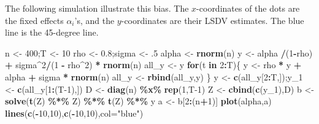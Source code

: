\documentclass[
  12pt,
]{book}
\newenvironment{Shaded}{\begin{snugshade}}{\end{snugshade}}
\newcommand{\AttributeTok}[1]{\textcolor[rgb]{0.13,0.29,0.53}{#1}}
\newcommand{\ControlFlowTok}[1]{\textcolor[rgb]{0.13,0.29,0.53}{\textbf{#1}}}
\newcommand{\DecValTok}[1]{\textcolor[rgb]{0.00,0.00,0.81}{#1}}
\newcommand{\FloatTok}[1]{\textcolor[rgb]{0.00,0.00,0.81}{#1}}
\newcommand{\FunctionTok}[1]{\textcolor[rgb]{0.13,0.29,0.53}{\textbf{#1}}}
\newcommand{\NormalTok}[1]{#1}
\newcommand{\OtherTok}[1]{\textcolor[rgb]{0.56,0.35,0.01}{#1}}
\newcommand{\SpecialCharTok}[1]{\textcolor[rgb]{0.81,0.36,0.00}{\textbf{#1}}}
\newcommand{\StringTok}[1]{\textcolor[rgb]{0.31,0.60,0.02}{#1}}
\theoremstyle{definition}
\theoremstyle{definition}
\theoremstyle{definition}
\theoremstyle{definition}
\theoremstyle{remark}
\begin{document}
The following simulation illustrate this bias. The \(x\)-coordinates of the dots are the fixed effects \(\alpha_i\)'s, and the \(y\)-coordinates are their LSDV estimates. The blue line is the 45-degree line.

\begin{Shaded}
\begin{Highlighting}[]
\NormalTok{n }\OtherTok{\textless{}{-}} \DecValTok{400}\NormalTok{;T }\OtherTok{\textless{}{-}} \DecValTok{10}
\NormalTok{rho }\OtherTok{\textless{}{-}} \FloatTok{0.8}\NormalTok{;sigma }\OtherTok{\textless{}{-}}\NormalTok{ .}\DecValTok{5}
\NormalTok{alpha }\OtherTok{\textless{}{-}} \FunctionTok{rnorm}\NormalTok{(n)}
\NormalTok{y }\OtherTok{\textless{}{-}}\NormalTok{ alpha }\SpecialCharTok{/}\NormalTok{(}\DecValTok{1}\SpecialCharTok{{-}}\NormalTok{rho) }\SpecialCharTok{+}\NormalTok{ sigma}\SpecialCharTok{\^{}}\DecValTok{2}\SpecialCharTok{/}\NormalTok{(}\DecValTok{1} \SpecialCharTok{{-}}\NormalTok{ rho}\SpecialCharTok{\^{}}\DecValTok{2}\NormalTok{) }\SpecialCharTok{*} \FunctionTok{rnorm}\NormalTok{(n)}
\NormalTok{all\_y }\OtherTok{\textless{}{-}}\NormalTok{ y}
\ControlFlowTok{for}\NormalTok{(t }\ControlFlowTok{in} \DecValTok{2}\SpecialCharTok{:}\NormalTok{T)\{}
\NormalTok{  y }\OtherTok{\textless{}{-}}\NormalTok{ rho }\SpecialCharTok{*}\NormalTok{ y }\SpecialCharTok{+}\NormalTok{ alpha }\SpecialCharTok{+}\NormalTok{ sigma }\SpecialCharTok{*} \FunctionTok{rnorm}\NormalTok{(n)}
\NormalTok{  all\_y }\OtherTok{\textless{}{-}} \FunctionTok{rbind}\NormalTok{(all\_y,y)}
\NormalTok{\}}
\NormalTok{y   }\OtherTok{\textless{}{-}} \FunctionTok{c}\NormalTok{(all\_y[}\DecValTok{2}\SpecialCharTok{:}\NormalTok{T,]);y\_1 }\OtherTok{\textless{}{-}} \FunctionTok{c}\NormalTok{(all\_y[}\DecValTok{1}\SpecialCharTok{:}\NormalTok{(T}\DecValTok{{-}1}\NormalTok{),])}
\NormalTok{D }\OtherTok{\textless{}{-}} \FunctionTok{diag}\NormalTok{(n) }\SpecialCharTok{\%x\%} \FunctionTok{rep}\NormalTok{(}\DecValTok{1}\NormalTok{,T}\DecValTok{{-}1}\NormalTok{)}
\NormalTok{Z }\OtherTok{\textless{}{-}} \FunctionTok{cbind}\NormalTok{(}\FunctionTok{c}\NormalTok{(y\_1),D)}
\NormalTok{b }\OtherTok{\textless{}{-}} \FunctionTok{solve}\NormalTok{(}\FunctionTok{t}\NormalTok{(Z) }\SpecialCharTok{\%*\%}\NormalTok{ Z) }\SpecialCharTok{\%*\%} \FunctionTok{t}\NormalTok{(Z) }\SpecialCharTok{\%*\%}\NormalTok{ y}
\NormalTok{a }\OtherTok{\textless{}{-}}\NormalTok{ b[}\DecValTok{2}\SpecialCharTok{:}\NormalTok{(n}\SpecialCharTok{+}\DecValTok{1}\NormalTok{)]}
\FunctionTok{plot}\NormalTok{(alpha,a)}
\FunctionTok{lines}\NormalTok{(}\FunctionTok{c}\NormalTok{(}\SpecialCharTok{{-}}\DecValTok{10}\NormalTok{,}\DecValTok{10}\NormalTok{),}\FunctionTok{c}\NormalTok{(}\SpecialCharTok{{-}}\DecValTok{10}\NormalTok{,}\DecValTok{10}\NormalTok{),}\AttributeTok{col=}\StringTok{"blue"}\NormalTok{)}
\end{Highlighting}
\end{Shaded}
\end{document}
